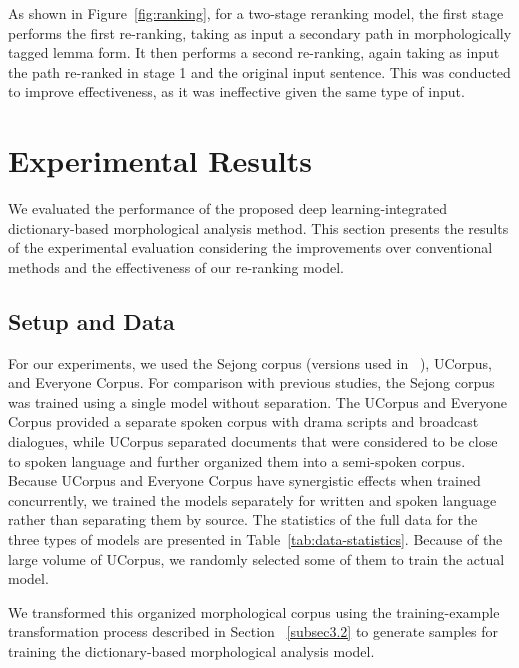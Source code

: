 \documentclass[AMS,STIX2COL]{WileyNJD-v2}
\begin{document}
    As shown in Figure~\ref{fig:ranking}, for a two-stage reranking model, the first stage performs the first re-ranking, taking as input a secondary path in morphologically tagged lemma form.
    It then performs a second re-ranking, again taking as input the path re-ranked in stage 1 and the original input sentence.
    This was conducted to improve effectiveness, as it was ineffective given the same type of input.


    \section{Experimental Results}\label{sec:results}

    We evaluated the performance of the proposed deep learning-integrated dictionary-based morphological analysis method.
    This section presents the results of the experimental evaluation considering the improvements over conventional methods and the effectiveness of our re-ranking model.

    \subsection{Setup and Data}\label{subsec5.1}

    For our experiments, we used the Sejong corpus (versions used in ~\cite{NaSH2014, NaSH2015, NaSH2018, SongHJ2019, SongHJ2020}), UCorpus\cite{UCorpusHG}, and Everyone Corpus\cite{EveryoneCorpus}.
    For comparison with previous studies, the Sejong corpus was trained using a single model without separation.
    The UCorpus and Everyone Corpus provided a separate spoken corpus with drama scripts and broadcast dialogues, while UCorpus separated documents that were considered to be close to spoken language and further organized them into a semi-spoken corpus.
    Because UCorpus and Everyone Corpus have synergistic effects when trained concurrently, we trained the models separately for written and spoken language rather than separating them by source.
    The statistics of the full data for the three types of models are presented in Table~\ref{tab:data-statistics}.
    Because of the large volume of UCorpus, we randomly selected some of them to train the actual model.

    We transformed this organized morphological corpus using the training-example transformation process described in Section ~\ref{subsec3.2} to generate samples for training the dictionary-based morphological analysis model.
\end{document}
